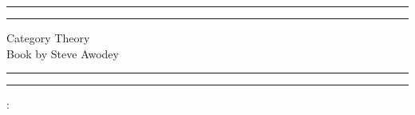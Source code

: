 \documentclass[a4paper, 11pt]{book}
\theoremstyle{plain}
\theoremstyle{plain}
\begin{document}
  \begin{titlepage}
	\centering %
	\scshape %
	\vspace*{1.5\baselineskip} %

	\rule{13cm}{1.6pt}\vspace*{-\baselineskip}\vspace*{2pt} %
	\rule{13cm}{0.4pt} %
	
		\vspace{0.75\baselineskip} %
	{	\Huge Category Theory\\ 
			\vspace{4mm}
		Book by Steve Awodey \\	}
		\vspace{0.75\baselineskip} %
	\rule{13cm}{0.4pt}\vspace*{-\baselineskip}\vspace{3.2pt} %
	\rule{13cm}{1.6pt} %
	
		\vspace{1.75\baselineskip} %
	{\large : 
		\vspace*{1.2\baselineskip}
	} \\
	\vfill

\end{titlepage}
\begingroup
\let\cleardoublepage\clearpage
\tableofcontents
\endgroup
\end{document}
